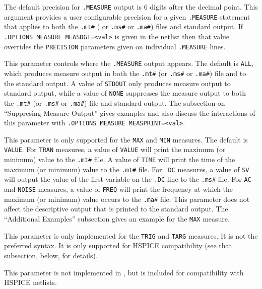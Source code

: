 \begin{Command}
\begin{Arguments}
The default precision for {\tt .MEASURE} output is 6 digits after the
decimal point.  This argument provides a user configurable precision
for a given {\tt .MEASURE} statement that applies to both
the \texttt{.mt\#} ( or \texttt{.ms\#} or \texttt{.ma\#}) files and
standard output.  If \texttt{.OPTIONS MEASURE MEASDGT=<val>} is given
in the netlist then that value overrides the \texttt{PRECISION}
parameters given on individual \texttt{.MEASURE} lines.


This parameter controls where the {\tt .MEASURE} output appears.  The
default is {\tt ALL}, which produces measure output in both
the \texttt{.mt\#} (or \texttt{.ms\#} or
\texttt{.ma\#}) file and to the standard output.  A value of
{\tt STDOUT} only produces measure output to standard output, while a
value of {\tt NONE} suppresses the measure output to both
the \texttt{.mt\#} (or \texttt{.ms\#} or \texttt{.ma\#}) file and
standard output.  The subsection on ``Suppresing Measure Output''
gives examples and also discuss the interactions of this parameter
with \texttt{.OPTIONS MEASURE MEASPRINT=<val>}.


This parameter is only supported for the {\tt MAX} and {\tt MIN}
measures.  The default is {\tt VALUE}.  For {\tt TRAN} measures, a
value of {\tt VALUE} will print the maximum (or minimum) value to
the \texttt {.mt\#} file.  A value of {\tt TIME} will print the time
of the maximum (or minimum) value to the \texttt{.mt\#} file. For {\tt
DC} measures, a value of {\tt SV} will output the value of the first
variable on the {\tt .DC} line to the \texttt{.ms\#} file.  For {\tt AC}
and {\tt NOISE} measures, a value of {\tt FREQ} will print the frequency
at which the maximum (or minimum) value occurs to the \texttt{.ma\#} file.
This parameter does not affect the descriptive output that is printed
to the standard output.  The ``Additional Examples'' subsection gives
an example for the {\tt MAX} measure.

This parameter is only implemented for the {\tt TRIG} and {\tt TARG}
measures.  It is not the preferred \Xyce{} syntax. It is only
supported for HSPICE compatibility (see that subsection, below, for
details).


This parameter is not implemented in \Xyce{}, but is included for compatibility
with HSPICE netlists.



\end{Arguments}
\end{Command}
